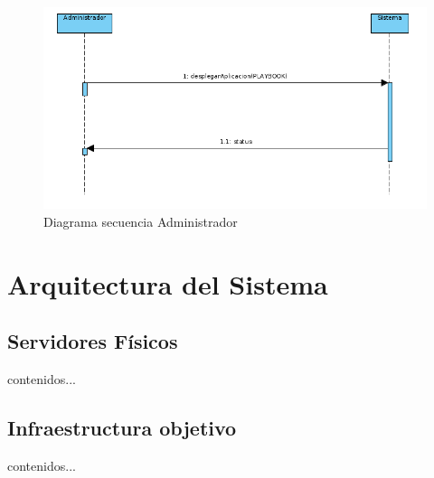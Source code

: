 		\begin{figure}[!hbt]
			\centering
			\includegraphics[scale=0.4]{imagenes/Analisis/diagrama_secuencia_administrador_2.png}
			\caption[Diagrama secuencia Desarrollador]{Diagrama secuencia Administrador \cite{diagramasecuencia:online}}
			\label{Diagrama secuencia}
		\end{figure}
		
	
	
\section{Arquitectura del Sistema}
	\subsection{Servidores Físicos}
		\begin{paragraph}
			contenidos...
		\end{paragraph}
	\subsection{Infraestructura objetivo}
		\begin{paragraph}
			contenidos...
		\end{paragraph}